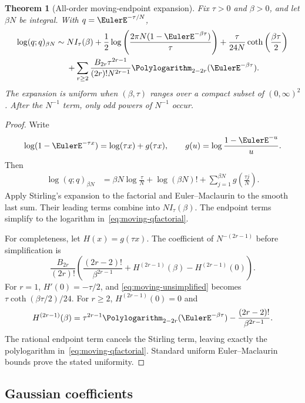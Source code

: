 \documentclass[11pt,oneside]{article}
\newtheorem{theorem}{Theorem}[section]
\theoremstyle{definition}
\theoremstyle{remark}
\newcommand{\cothh}{\operatorname{coth}}
\let\reportsubsection\subsection
\let\section\reportsubsection
\begin{document}
\begin{theorem}[All-order moving-endpoint expansion]
\label{thm:moving-qfactorial}
Fix $\tau>0$ and $\beta>0$, and let $\beta N$ be integral.  With
$q=\EulerE^{-\tau/N}$,
\begin{align}
 \log(q;q)_{\beta N}
 \sim{}&N I_\tau(\beta)
 +\frac12\log\left(\frac{2\pi N(1-\EulerE^{-\beta\tau})}{\tau}\right)
 +\frac{\tau}{24N}\cothh\left(\frac{\beta\tau}{2}\right)
 \notag\\
 &+\sum_{r\ge2}
 \frac{B_{2r}\tau^{2r-1}}{(2r)!N^{2r-1}}
 \Polylogarithm_{2-2r}(\EulerE^{-\beta\tau}).                    \label{eq:moving-qfactorial}
\end{align}
The expansion is uniform when $(\beta,\tau)$ ranges over a compact subset of
$(0,\infty)^2$.  After the $N^{-1}$ term, only odd powers of $N^{-1}$ occur.
\end{theorem}

\begin{proof}
Write
\[
 \log(1-\EulerE^{-\tau x})=\log(\tau x)+g(\tau x),
 \qquad
 g(u)=\log\frac{1-\EulerE^{-u}}u.
\]
Then
\begin{align*}
 \log(q;q)_{\beta N}
 &=\beta N\log\frac{\tau}{N}+\log(\beta N)!
   +\sum_{j=1}^{\beta N}g\left(\frac{\tau j}{N}\right).
\end{align*}
Apply Stirling's expansion to the factorial and Euler--Maclaurin to the smooth
last sum.  Their leading terms combine into $NI_\tau(\beta)$.  The endpoint
terms simplify to the logarithm in~\eqref{eq:moving-qfactorial}.

For completeness, let $H(x)=g(\tau x)$.  The coefficient of
$N^{-(2r-1)}$ before simplification is
\begin{equation}\label{eq:moving-unsimplified}
 \frac{B_{2r}}{(2r)!}
 \left(
 \frac{(2r-2)!}{\beta^{2r-1}}
 +H^{(2r-1)}(\beta)-H^{(2r-1)}(0)
 \right).
\end{equation}
For $r=1$, $H'(0)=-\tau/2$, and
\eqref{eq:moving-unsimplified} becomes
$\tau\cothh(\beta\tau/2)/24$.  For $r\ge2$,
$H^{(2r-1)}(0)=0$ and
\[
 H^{(2r-1)}(\beta)
 =\tau^{2r-1}\Polylogarithm_{2-2r}(\EulerE^{-\beta\tau})
 -\frac{(2r-2)!}{\beta^{2r-1}}.
\]
The rational endpoint term cancels the Stirling term, leaving exactly the
polylogarithm in~\eqref{eq:moving-qfactorial}.  Standard uniform
Euler--Maclaurin bounds prove the stated uniformity.
\end{proof}

\section{Gaussian coefficients}
\end{document}
